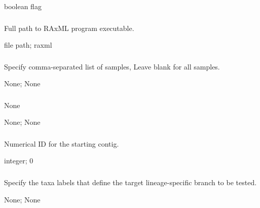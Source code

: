 \documentclass[letterpaper,11pt,english]{sphinxmanual}
\begin{document}
 boolean flag


\subsubsection{}
\label{\detokenize{prog_desc:raxml-path-raxmlpath}}
 Full path to RAxML program executable.

 file path;  raxml


\subsubsection{}
\label{\detokenize{prog_desc:id107}}
 Specify comma-separated list of samples, Leave blank for all samples.

 None;  None


\subsubsection{}
\label{\detokenize{prog_desc:species-groups-speciesgroups}}
 None

 None;  None


\subsubsection{}
\label{\detokenize{prog_desc:start-contig-startcontig}}
 Numerical ID for the starting contig.

 integer;  0


\subsubsection{}
\label{\detokenize{prog_desc:target}}
 Specify the taxa labels that define the target lineage-specific branch to be tested.

 None;  None
\end{document}
